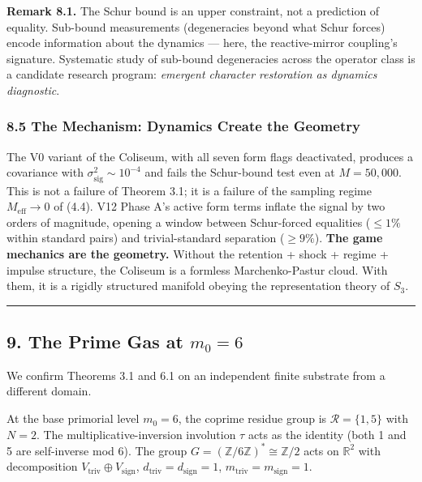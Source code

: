 \documentclass[
  11pt,
]{article}
\begin{document}
\textbf{Remark 8.1.} The Schur bound is an upper constraint, not a
prediction of equality. Sub-bound measurements (degeneracies beyond what
Schur forces) encode information about the dynamics --- here, the
reactive-mirror coupling's signature. Systematic study of sub-bound
degeneracies across the operator class is a candidate research program:
\emph{emergent character restoration as dynamics diagnostic}.

\subsubsection{8.5 The Mechanism: Dynamics Create the
Geometry}\label{the-mechanism-dynamics-create-the-geometry}

The V0 variant of the Coliseum, with all seven form flags deactivated,
produces a covariance with \(\sigma_\text{sig}^2 \sim 10^{-4}\) and
fails the Schur-bound test even at \(M = 50{,}000\). This is not a
failure of Theorem 3.1; it is a failure of the sampling regime
\(M_\text{eff} \to 0\) of (4.4). V12 Phase A's active form terms inflate
the signal by two orders of magnitude, opening a window between
Schur-forced equalities (\(\leq 1\%\) within standard pairs) and
trivial-standard separation (\(\geq 9\%\)). \textbf{The game mechanics
are the geometry.} Without the retention + shock + regime + impulse
structure, the Coliseum is a formless Marchenko-Pastur cloud. With them,
it is a rigidly structured manifold obeying the representation theory of
\(S_3\).

\begin{center}\rule{0.5\linewidth}{0.5pt}\end{center}

\subsection{\texorpdfstring{9. The Prime Gas at
\(m_0 = 6\)}{9. The Prime Gas at m\_0 = 6}}\label{the-prime-gas-at-m_0-6}

We confirm Theorems 3.1 and 6.1 on an independent finite substrate from
a different domain.

At the base primorial level \(m_0 = 6\), the coprime residue group is
\(\mathcal{R} = \{1, 5\}\) with \(N = 2\). The multiplicative-inversion
involution \(\tau\) acts as the identity (both 1 and 5 are self-inverse
mod 6). The group \(G = (\mathbb{Z}/6\mathbb{Z})^* \cong \mathbb{Z}/2\)
acts on \(\mathbb{R}^2\) with decomposition
\(V_\text{triv} \oplus V_\text{sign}\),
\(d_\text{triv} = d_\text{sign} = 1\),
\(m_\text{triv} = m_\text{sign} = 1\).
\end{document}
